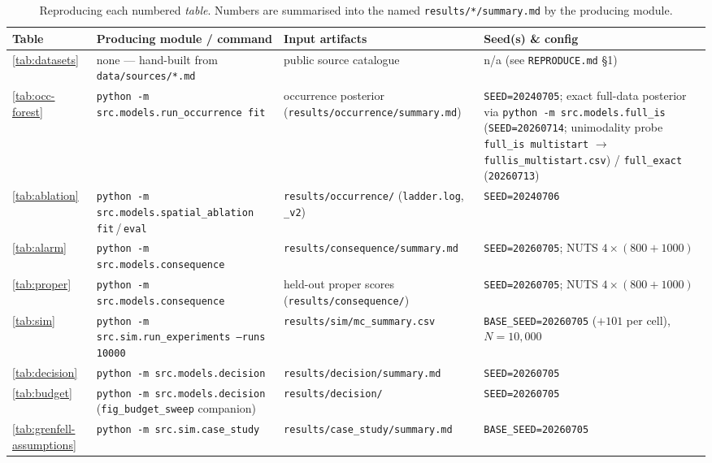 \begin{table}[htbp]
  \centering
  \small
  \setlength{\tabcolsep}{4pt}
  \caption{Reproducing each numbered \emph{table}. Numbers are summarised into the
  named \texttt{results/*/summary.md} by the producing module.}
  \label{tab:repro-tab1}
  \begin{tabular}{@{}p{1.6cm}p{4.6cm}p{4.0cm}p{4.0cm}@{}}
    \toprule
    Table & Producing module / command & Input artifacts & Seed(s) \& config \\
    \midrule
    \ref{tab:datasets} & none --- hand-built from \texttt{data/sources/*.md}
      & public source catalogue & n/a (see \texttt{REPRODUCE.md} \S1) \\
    \ref{tab:occ-forest} & \texttt{python -m src.models.run\_occurrence fit}
      & occurrence posterior (\texttt{results/occurrence/summary.md})
      & \texttt{SEED=20240705}; exact full-data posterior via
      \texttt{python -m src.models.full\_is} (\texttt{SEED=20260714};
      unimodality probe \texttt{full\_is multistart} $\to$
      \texttt{fullis\_multistart.csv}) / \texttt{full\_exact} (\texttt{20260713}) \\
    \ref{tab:ablation} & \texttt{python -m src.models.spatial\_ablation fit}\,/\,\texttt{eval}
      & \texttt{results/occurrence/} (\texttt{ladder.log}, \texttt{\_v2})
      & \texttt{SEED=20240706} \\
    \ref{tab:alarm} & \texttt{python -m src.models.consequence}
      & \texttt{results/consequence/summary.md}
      & \texttt{SEED=20260705}; NUTS $4\times(800{+}1000)$ \\
    \ref{tab:proper} & \texttt{python -m src.models.consequence}
      & held-out proper scores (\texttt{results/consequence/})
      & \texttt{SEED=20260705}; NUTS $4\times(800{+}1000)$ \\
    \ref{tab:sim} & \texttt{python -m src.sim.run\_experiments --runs 10000}
      & \texttt{results/sim/mc\_summary.csv}
      & \texttt{BASE\_SEED=20260705} ($+101$ per cell), $N{=}10{,}000$ \\
    \ref{tab:decision} & \texttt{python -m src.models.decision}
      & \texttt{results/decision/summary.md}
      & \texttt{SEED=20260705} \\
    \ref{tab:budget} & \texttt{python -m src.models.decision}
      (\texttt{fig\_budget\_sweep} companion) & \texttt{results/decision/}
      & \texttt{SEED=20260705} \\
    \ref{tab:grenfell-assumptions} & \texttt{python -m src.sim.case\_study}
      & \texttt{results/case\_study/summary.md} & \texttt{BASE\_SEED=20260705} \\

\end{tabular}
\end{table}
